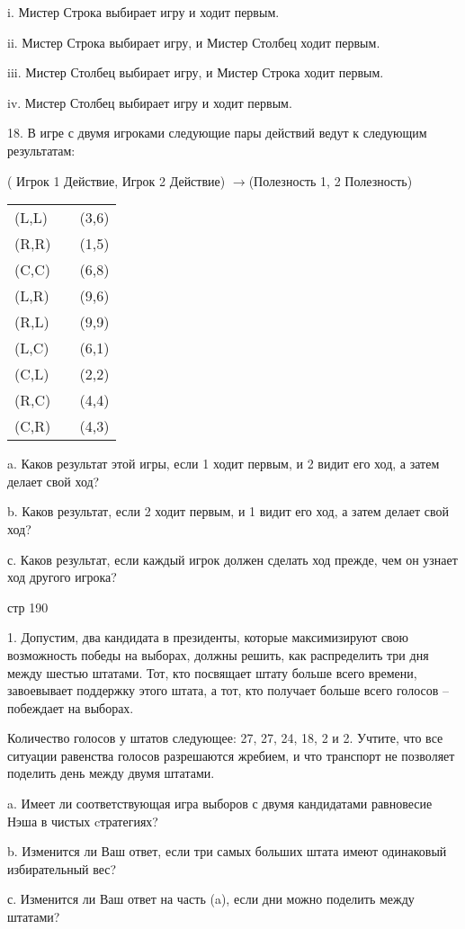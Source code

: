 \documentclass[a4paper,12pt]{article}
\begin{document}
i. Мистер Строка выбирает игру и ходит первым.

ii. Мистер Строка выбирает игру, и Мистер Столбец
ходит первым.

iii. Мистер Столбец выбирает игру, и Мистер Строка
ходит первым.

iv. Мистер Столбец выбирает игру и ходит первым.

18. В игре с двумя игроками следующие пары действий
ведут к следующим результатам:

( Игрок 1 Действие, Игрок 2 Действие) $\rightarrow
$(Полезность 1, 2 Полезность)

\begin{tabular}{lll}
(L,L) &  & (3,6) \\ (R,R) &  & (1,5) \\ (C,C) &  & (6,8) \\
(L,R) &  & (9,6) \\ (R,L) &  & (9,9) \\ (L,C) &  & (6,1) \\
(C,L) &  & (2,2) \\ (R,C) &  & (4,4) \\ (C,R) &  &
(4,3)\end{tabular}

a. Каков результат этой игры, если 1 ходит первым,
и 2 видит его ход, а затем делает свой ход?

b. Каков результат, если 2 ходит первым, и 1 видит
его ход, а затем делает свой ход?

с. Каков результат, если каждый игрок должен
сделать ход прежде, чем он узнает ход другого
игрока?

стр 190

1. Допустим, два кандидата в президенты, которые
максимизируют свою возможность победы на выборах,
должны решить, как распределить три дня между
шестью штатами. Тот, кто посвящает штату больше
всего времени, завоевывает поддержку этого штата, а
тот, кто получает больше всего голосов -- побеждает
на выборах.

Количество голосов у штатов следующее: 27, 27, 24,
18, 2 и 2. Учтите, что все ситуации равенства
голосов разрешаются жребием, и что транспорт не
позволяет поделить день между двумя штатами.

a. Имеет ли соответствующая игра выборов с двумя
кандидатами равновесие Нэша в чистых cтратегиях?

b. Изменится ли Ваш ответ, если три самых больших
штата имеют одинаковый избирательный вес?

с. Изменится ли Ваш ответ на часть (a), если дни
можно поделить между штатами?
\end{document}
